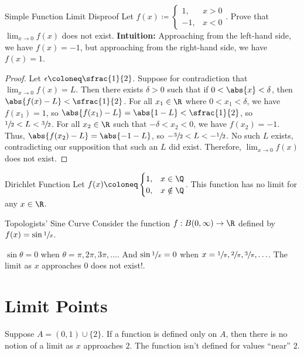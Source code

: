 \begin{exbox}{Simple Function Limit Disproof}{}
    Let $f(x) \coloneq \begin{cases}
        1, & x > 0 \\
        -1, & x < 0
    \end{cases}$.
    Prove that $\lim_{x \to 0} f(x)$ does not exist.
    \tcblower
    \textbf{Intuition:} Approaching from the left-hand side, we have $f(x) = -1$, but approaching from the right-hand side, we have $f(x) = 1$.
    \begin{proof}
        Let $\epsilon \coloneq \sfrac{1}{2}$. Suppose for contradiction that $\lim_{x \to 0} f(x) = L$. Then there exists $\delta > 0$ such that if $0 < \abs{x} < \delta$, then $\abs{f(x) - L} < \sfrac{1}{2}$. For all $x_1 \in \R$ where $0 < x_1 < \delta$, we have $f(x_1) = 1$, so $\abs{f(x_1) - L} = \abs{1 - L} < \sfrac{1}{2}$, so $\sfrac{1}{2} < L < \sfrac{3}{2}$. For all $x_2 \in \R$ such that $-\delta < x_2 < 0$, we have $f(x_2) = -1$. Thus, $\abs{f(x_2) - L} = \abs{-1 - L}$, so $-\sfrac{3}{2} < L < -\sfrac{1}{2}$. No such $L$ exists, contradicting our supposition that such an $L$ did exist. Therefore, $\lim_{x \to 0} f(x)$ does not exist.
    \end{proof}
\end{exbox}

\begin{exbox}{Dirichlet Function}{}
    Let $f(x) \coloneq \begin{cases}
        1, & x \in \Q \\
        0, & x \notin \Q
    \end{cases}$. This function has no limit for any $x \in \R$.
\end{exbox}

\begin{exbox}{Topologists' Sine Curve}{}
    Consider the function $f: B(0, \infty) \to \R$ defined by $f(x) = \sin \sfrac{1}{x}$.

    $\sin \theta = 0$ when $\theta = \pi, 2\pi, 3\pi, \ldots$. And $\sin \sfrac{1}{x} = 0$ when $x = \sfrac{1}{\pi}, \sfrac{2}{\pi}, \sfrac{3}{\pi}, \ldots$. The limit as $x$ approaches $0$ does not exist!.
\end{exbox}

\section{Limit Points}

Suppose $A = (0,1) \cup \{2\}$. If a function is defined only on $A$, then there is no notion of a limit as $x$ approaches $2$. The function isn't defined for values ``near'' $2$.

